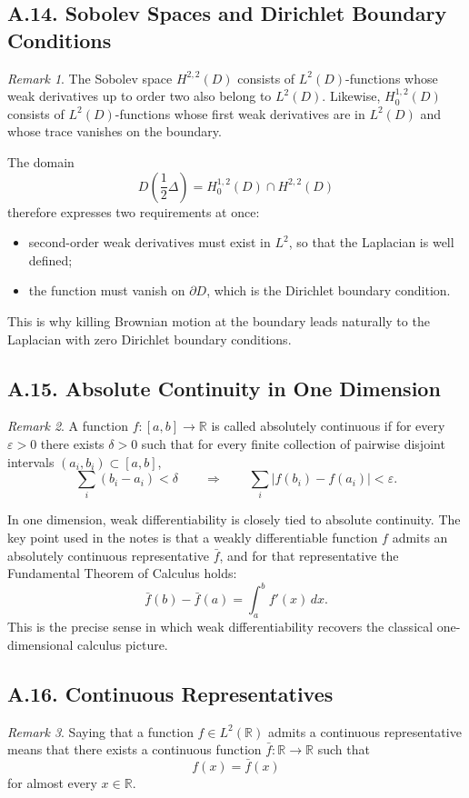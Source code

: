 \documentclass[11pt]{article}
\theoremstyle{definition}
\theoremstyle{remark}
\newtheorem{remark}{Remark}
\begin{document}
\subsection*{A.14. Sobolev Spaces and Dirichlet Boundary Conditions}
\begin{remark}
The Sobolev space \(H^{2,2}(D)\) consists of \(L^2(D)\)-functions whose weak derivatives up to order two also belong to \(L^2(D)\). Likewise, \(H_0^{1,2}(D)\) consists of \(L^2(D)\)-functions whose first weak derivatives are in \(L^2(D)\) and whose trace vanishes on the boundary.

The domain
\[
D\!\left(\frac12\Delta\right)=H_0^{1,2}(D)\cap H^{2,2}(D)
\]
therefore expresses two requirements at once:
\begin{itemize}
\item second-order weak derivatives must exist in \(L^2\), so that the Laplacian is well defined;
\item the function must vanish on \(\partial D\), which is the Dirichlet boundary condition.
\end{itemize}
This is why killing Brownian motion at the boundary leads naturally to the Laplacian with zero Dirichlet boundary conditions.
\end{remark}

\subsection*{A.15. Absolute Continuity in One Dimension}
\begin{remark}
A function \(f:[a,b]\to\mathbb R\) is called absolutely continuous if for every \(\varepsilon>0\) there exists \(\delta>0\) such that for every finite collection of pairwise disjoint intervals \((a_i,b_i)\subset [a,b]\),
\[
\sum_i (b_i-a_i)<\delta
\qquad \Longrightarrow \qquad
\sum_i |f(b_i)-f(a_i)|<\varepsilon.
\]

In one dimension, weak differentiability is closely tied to absolute continuity. The key point used in the notes is that a weakly differentiable function \(f\) admits an absolutely continuous representative \(\bar f\), and for that representative the Fundamental Theorem of Calculus holds:
\[
\bar f(b)-\bar f(a)=\int_a^b f'(x)\,dx.
\]
This is the precise sense in which weak differentiability recovers the classical one-dimensional calculus picture.
\end{remark}

\subsection*{A.16. Continuous Representatives}
\begin{remark}
Saying that a function \(f\in L^2(\mathbb R)\) admits a continuous representative means that there exists a continuous function \(\bar f:\mathbb R\to\mathbb R\) such that
\[
f(x)=\bar f(x)
\]
for almost every \(x\in\mathbb R\).
\end{remark}
\end{document}
